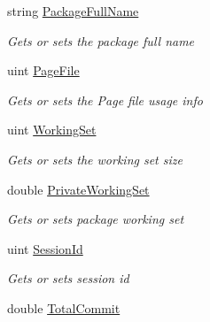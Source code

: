 \begin{DoxyCompactItemize}
string \hyperlink{class_microsoft_1_1_tools_1_1_windows_device_portal_1_1_device_portal_1_1_device_process_info_a2c3ba190b1b316754b8fce2dbfa2fe05}{Package\+Full\+Name}
\begin{DoxyCompactList}\small\item\em Gets or sets the package full name \end{DoxyCompactList}\item 
uint \hyperlink{class_microsoft_1_1_tools_1_1_windows_device_portal_1_1_device_portal_1_1_device_process_info_a996673a4797a026c858381fa9227925d}{Page\+File}
\begin{DoxyCompactList}\small\item\em Gets or sets the Page file usage info \end{DoxyCompactList}\item 
uint \hyperlink{class_microsoft_1_1_tools_1_1_windows_device_portal_1_1_device_portal_1_1_device_process_info_a64f82860f3f0f6ff379794a1d0134aa9}{Working\+Set}
\begin{DoxyCompactList}\small\item\em Gets or sets the working set size \end{DoxyCompactList}\item 
double \hyperlink{class_microsoft_1_1_tools_1_1_windows_device_portal_1_1_device_portal_1_1_device_process_info_afb921b40aac9af842823c3fae432e8f3}{Private\+Working\+Set}
\begin{DoxyCompactList}\small\item\em Gets or sets package working set \end{DoxyCompactList}\item 
uint \hyperlink{class_microsoft_1_1_tools_1_1_windows_device_portal_1_1_device_portal_1_1_device_process_info_a57beea52c9016667ea8b190e74a16762}{Session\+Id}
\begin{DoxyCompactList}\small\item\em Gets or sets session id \end{DoxyCompactList}\item 
double \hyperlink{class_microsoft_1_1_tools_1_1_windows_device_portal_1_1_device_portal_1_1_device_process_info_a5bafc220372b35366de156aa581475ba}{Total\+Commit}

\end{DoxyCompactItemize}
